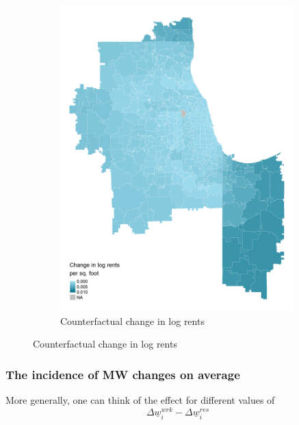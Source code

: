 \documentclass[aspectratio=169, t]{beamer}
\newcommand{\MW}{\underline{w}}
\begin{document}
\begin{frame}
\begin{figure}
\begin{subfigure}{0.33\textwidth}
                         \includegraphics[width = 0.99\textwidth]{counterfactuals/output/chicago_d_ln_rents.png}
            \caption*{Counterfactual change in log rents}
        \end{subfigure}
    \end{figure}    
\end{frame}

\begin{frame}
    \frametitle{The incidence of MW changes on average}
    
    \vspace{3mm}

    \pause
    \vspace{3mm}

    More generally, one can think of the effect for different values of 
    $$
        \Delta \MW_i^{wrk} - \Delta \MW_i^{res}
    $$
\end{frame}
\end{document}
